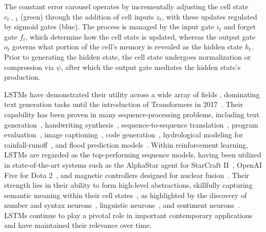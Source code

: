 The constant error carousel operates by incrementally adjusting the cell state $c_{t-1}$ (green) through the addition of cell inputs $z_t$, with these updates regulated by sigmoid gates (blue). The process is managed by the input gate $i_t$ and forget gate $f_t$, which determine how the cell state is updated, whereas the output gate $o_t$ governs what portion of the cell's memory is revealed as the hidden state $h_t$. Prior to generating the hidden state, the cell state undergoes normalization or compression via $\psi$, after which the output gate mediates the hidden state’s production.

LSTMs have demonstrated their utility across a wide array of fields \citep{Hochreiter:01,Hochreiter:07,Schmidhuber:15}, dominating text generation tasks until the introduction of Transformers in 2017~\citep{Vaswani:17}. Their capability has been proven in many sequence-processing problems, including text generation~\citep{Graves:13,Karpathy:15blog}, handwriting synthesis~\citep{Graves:13}, sequence-to-sequence translation~\citep{Sutskever:14nips}, program evaluation~\citep{Zaremba:14arxiv}, image captioning~\citep{Karpathy:15,Hossain:19}, code generation~\citep{Karpathy:15blog}, hydrological modeling for rainfall-runoff~\citep{Kratzert:18,Kratzert:19}, and flood prediction models~\citep{Nearing:24}. Within reinforcement learning, LSTMs are regarded as the top-performing sequence models, having been utilized in state-of-the-art systems such as the AlphaStar agent for StarCraft II~\citep{Vinyals:17short}, OpenAI Five for Dota 2~\citep{OpenAI:19}, and magnetic controllers designed for nuclear fusion~\citep{Degrave:22short}. Their strength lies in their ability to form high-level abstractions, skillfully capturing semantic meaning within their cell states~\citep{Karpathy:15blog}, as highlighted by the discovery of number and syntax neurons~\citep{Lakretz:19}, linguistic neurons~\citep{Bau:19}, and sentiment neurons~\citep{Radford:17arxiv}. LSTMs continue to play a pivotal role in important contemporary applications~\citep{Degrave:22short,Nearing:24} and have maintained their relevance over time.

